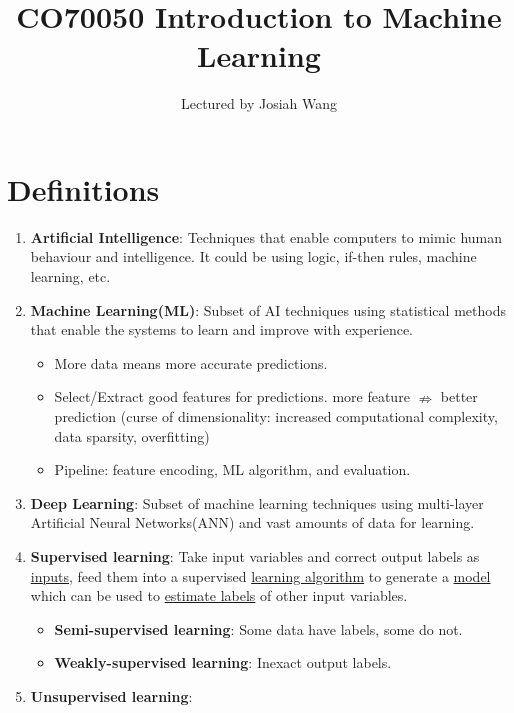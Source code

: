\documentclass[twocolumn,landscape,10pt]{article}
\author{Lectured by Josiah Wang}
\title{CO70050 Introduction to Machine Learning}
\affil{Typed by Aris Zhu Yi Qing}
\theoremstyle{definition}
\begin{document}
\maketitle
\newpage

\section{Definitions}

\begin{enumerate}
    \item \textbf{Artificial Intelligence}:
        Techniques that enable computers to mimic human behaviour and
        intelligence. It could be using logic, if-then rules, machine learning,
        etc.
    \item \textbf{Machine Learning(ML)}:
        Subset of AI techniques using statistical methods that enable the
        systems to learn and improve with experience.
        \begin{itemize}
            \item More data means more accurate predictions.
            \item Select/Extract good features for predictions. 
                more feature $\nRightarrow$ better prediction (curse of
                dimensionality: increased computational complexity, data sparsity,
                overfitting)
            \item Pipeline: feature encoding, ML algorithm, and evaluation.
        \end{itemize} 
    \item \textbf{Deep Learning}:
        Subset of machine learning techniques using multi-layer Artificial
        Neural Networks(ANN) and vast amounts of data for learning.
    \item \textbf{Supervised learning}:
        Take input variables and correct output labels as \underline{inputs}, 
        feed them into a supervised \underline{learning algorithm} 
        to generate a \underline{model} which can be used to
        \underline{estimate labels} of other input variables.
        \begin{itemize}
            \item \textbf{Semi-supervised learning}:
                Some data have labels, some do not.
            \item \textbf{Weakly-supervised learning}:
                Inexact output labels.
        \end{itemize} 
    \item \textbf{Unsupervised learning}:

\end{enumerate}
\end{document}

